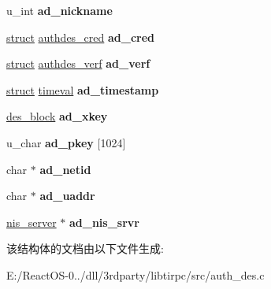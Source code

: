 \begin{DoxyCompactItemize}
\item 
\mbox{\label{structad__private_aaba804a1647a75327f8eb4b388d0f326}} 
u\+\_\+int {\bfseries ad\+\_\+nickname}
\item 
\mbox{\label{structad__private_ab38cceb65f825095942df28a986669f8}} 
\hyperlink{interfacestruct}{struct} \hyperlink{structauthdes__cred}{authdes\+\_\+cred} {\bfseries ad\+\_\+cred}
\item 
\mbox{\label{structad__private_a193c88170f80d77e58f151c1bee21944}} 
\hyperlink{interfacestruct}{struct} \hyperlink{structauthdes__verf}{authdes\+\_\+verf} {\bfseries ad\+\_\+verf}
\item 
\mbox{\label{structad__private_aab9fae9564d07800e33884e28e3b5477}} 
\hyperlink{interfacestruct}{struct} \hyperlink{structtimeval}{timeval} {\bfseries ad\+\_\+timestamp}
\item 
\mbox{\label{structad__private_ae024f60990e9065263eec2b0e4d1d5f3}} 
\hyperlink{uniondes__block}{des\+\_\+block} {\bfseries ad\+\_\+xkey}
\item 
\mbox{\label{structad__private_ac23f474609ae452e432e05c58acd5c3e}} 
u\+\_\+char {\bfseries ad\+\_\+pkey} \mbox{[}1024\mbox{]}
\item 
\mbox{\label{structad__private_a2d8af5780be2a6bbecc5c1a95156455e}} 
char $\ast$ {\bfseries ad\+\_\+netid}
\item 
\mbox{\label{structad__private_a7b8a4b590a789239ef97a642700b6819}} 
char $\ast$ {\bfseries ad\+\_\+uaddr}
\item 
\mbox{\label{structad__private_aea921ff52a5b020b30270f433f876cf2}} 
\hyperlink{structnis__server}{nis\+\_\+server} $\ast$ {\bfseries ad\+\_\+nis\+\_\+srvr}
\end{DoxyCompactItemize}


该结构体的文档由以下文件生成\+:\begin{DoxyCompactItemize}
\item 
E\+:/\+React\+O\+S-\/0../dll/3rdparty/libtirpc/src/auth\+\_\+des.\+c\end{DoxyCompactItemize}
